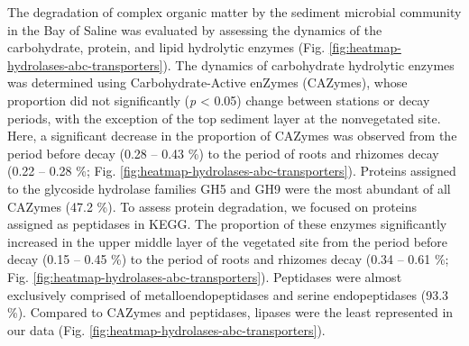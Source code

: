 \documentclass[
  12 pt,
]{article}
\begin{document}
The degradation of complex organic matter by the sediment microbial community in the Bay of Saline was evaluated by assessing the dynamics of the carbohydrate, protein, and lipid hydrolytic enzymes (Fig. \ref{fig:heatmap-hydrolases-abc-transporters}). The dynamics of carbohydrate hydrolytic enzymes was determined using Carbohydrate-Active enZymes (CAZymes), whose proportion did not significantly (\emph{p} \textless{} 0.05) change between stations or decay periods, with the exception of the top sediment layer at the nonvegetated site. Here, a significant decrease in the proportion of CAZymes was observed from the period before decay (0.28 -- 0.43 \si{\percent}) to the period of roots and rhizomes decay (0.22 -- 0.28 \si{\percent}; Fig. \ref{fig:heatmap-hydrolases-abc-transporters}). Proteins assigned to the glycoside hydrolase families GH5 and GH9 were the most abundant of all CAZymes (47.2 \si{\percent}). To assess protein degradation, we focused on proteins assigned as peptidases in KEGG. The proportion of these enzymes significantly increased in the upper middle layer of the vegetated site from the period before decay (0.15 -- 0.45 \si{\percent}) to the period of roots and rhizomes decay (0.34 -- 0.61 \si{\percent}; Fig. \ref{fig:heatmap-hydrolases-abc-transporters}). Peptidases were almost exclusively comprised of metalloendopeptidases and serine endopeptidases (93.3 \si{\percent}). Compared to CAZymes and peptidases, lipases were the least represented in our data (Fig. \ref{fig:heatmap-hydrolases-abc-transporters}).
\end{document}
